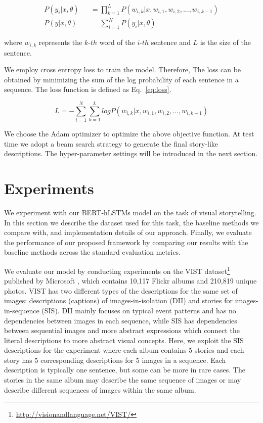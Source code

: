 \documentclass[a4paper,fleqn]{cas-sc}
\begin{document}
\begin{eqnarray} \label{eq:probability}
P(y_i|x,\theta) && = \prod_{k = 1}^{L} P(w_{i,k}|x,w_{i,1},w_{i,2},...,w_{i,k-1}) \nonumber\\
P(y|x,\theta) && = \sum_{i=1}^N P(y_i|x,\theta) 
\end{eqnarray}

where $w_{i,k}$ represents the $k$-${th}$ word of the $i$-${th}$ sentence and $L$ is the size of the sentence.

We employ  cross entropy loss to train the model. Therefore, The loss can be obtained by minimizing the sum of the log probability of each sentence in a sequence. The loss function is defined as Eq.~\ref{eq:loss}.

\begin{equation} \label{eq:loss}
L = -\sum_{i=1}^N \sum_{k = 1}^{L}logP(w_{i,k}|x,w_{i,1},w_{i,2},...,w_{i,k-1})
\end{equation} 

We choose the Adam optimizer to optimize the above objective function. At test time we adopt a beam search strategy to generate the final story-like descriptions. The hyper-parameter settings  will be introduced in the next section.

\section{Experiments}

We experiment with our BERT-hLSTMs model on the task of visual storytelling. In this section we describe the dataset used for this task, the baseline methods we compare with, and implementation details of our approach. Finally, we evaluate the performance of our proposed framework by comparing our results with the baseline methods across the standard evaluation metrics.

 We evaluate our model by conducting experiments on the VIST dataset\footnote{\url{http://visionandlanguage.net/VIST/}} published by Microsoft \citep{Huang2016}, which contains 10,117 Flickr albums and 210,819 unique photos. VIST has two different types of the descriptions for the same set of images: descriptions (captions) of images-in-isolation (DII) and stories for images-in-sequence (SIS). DII mainly focuses on typical event patterns and has no dependencies between images in each sequence, while SIS has dependencies between sequential images and more abstract expressions which connect the literal descriptions to more abstract visual concepts. Here, we exploit the SIS descriptions for the experiment where each album contains 5 stories and each story has 5 corresponding  descriptions  for 5 images in a sequence. Each description is typically one sentence, but some can be more in rare cases. The stories in the same album may describe the same sequence of images or may describe  different sequences of images within the same album.
\end{document}

